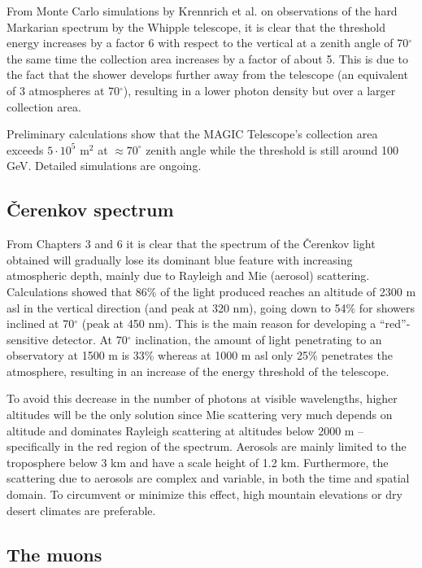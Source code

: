 From Monte Carlo simulations by Krennrich et al. \cite{krennrich:95} on observations of
the hard Markarian spectrum by the Whipple telescope, it is clear that the
threshold energy increases by a factor 6 with respect to the vertical at a
zenith angle of 70$^\circ$ the same time the collection area increases by a
factor of about 5. This is due to the fact that the shower develops further away
from the telescope (an equivalent of 3 atmospheres at 70$^\circ$), resulting in a
lower photon density but over a larger collection area.

Preliminary calculations show that the MAGIC Telescope's collection area exceeds $5 \cdot
10^5$ m$^2$ at $\approx 70^\circ$ zenith angle while the threshold is still
around 100 GeV. Detailed simulations are ongoing.

\subsection{\v{C}erenkov spectrum}


\medskip From Chapters 3 and 6 it is clear that the spectrum of the \v{C}erenkov
light obtained will gradually lose its dominant blue feature with increasing
atmospheric depth, mainly due to Rayleigh and Mie (aerosol) scattering.
Calculations showed that 86\% of the light produced reaches an altitude of
2300 m asl in the vertical direction (and peak at 320 nm), going down to
54\% for showers inclined at 70$^\circ$ (peak at 450 nm). This is the main
reason for developing a ``red''-sensitive detector. At 70$^\circ$
inclination, the amount of light penetrating to an observatory at 1500 m is
33\% whereas at 1000 m asl only 25\% penetrates the atmosphere, resulting in
an increase of the energy threshold of the telescope.

To avoid this decrease in the number of photons at visible wavelengths,
higher altitudes will be the only solution since Mie scattering very much
depends on altitude and dominates Rayleigh scattering at altitudes below
2000 m -- specifically in the red region of the spectrum. 
Aerosols are mainly limited to the troposphere below 3 km and have a
scale height of 1.2 km. Furthermore, the scattering due to aerosols are
complex and variable, in both the time and spatial domain. To circumvent or
minimize this effect, high mountain elevations or dry desert climates are
preferable.

\subsection{The muons}

